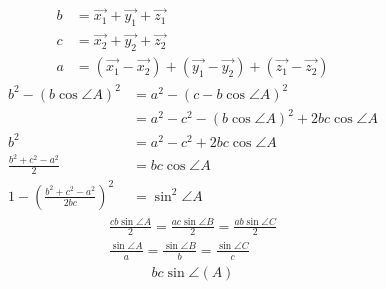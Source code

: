 \documentclass{article}
\begin{document}
  \begin{align*}
    b &= \vec{x_{1}} + \vec{y_{1}} + \vec{z_{1}}\\
    c &= \vec{x_{2}} + \vec{y_{2}} + \vec{z_{2}}\\
    a &= \left( \vec{x_{1}} - \vec{x_{2}} \right) + \left( \vec{y_{1}} - \vec{y_{2}} \right) + \left( \vec{z_{1}} - \vec{z_{2}} \right)
  \end{align*}
  \begin{align*}
    b^{2} - \left( b\cos{\angle{A}} \right)^{2} &= a^{2} - \left( c-b\cos{\angle{A}} \right)^{2}\\
    &= a^{2} - c^{2} - \left( b\cos{\angle{A}} \right)^{2} + 2bc\cos{\angle{A}}\\
    b^{2} &= a^{2} - c^{2} + 2bc\cos{\angle{A}}\\
    \frac{b^{2} + c^{2} - a^{2}}{2} &= bc\cos{\angle{A}}\\
    1 - (\frac{b^{2} + c^{2} - a^{2}}{2bc} )^{2} &= \sin^{2}{\angle{A}}
  \end{align*}
  \begin{align*}
    \frac{cb\sin{\angle{A}}}{2} = \frac{ac\sin{\angle{B}}}{2} = \frac{ab\sin{\angle{C}}}{2}\\
    \frac{\sin{\angle{A}}}{a} = \frac{\sin{\angle{B}}}{b} = \frac{\sin{\angle{C}}}{c}
  \end{align*}
  \begin{align*}
    bc\sin{\angle\left(A\right)}
  \end{align*}
\end{document}
